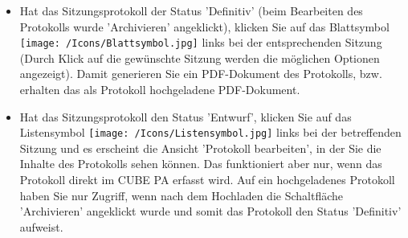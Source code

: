 \begin{itemize}
\item
Hat das Sitzungsprotokoll der Status 'Definitiv' (beim Bearbeiten des Protokolls wurde 'Archivieren' angeklickt), klicken Sie auf das Blattsymbol \texttt{[image: /Icons/Blattsymbol.jpg]}  links bei der entsprechenden Sitzung (Durch Klick auf die gewünschte Sitzung werden die möglichen Optionen angezeigt). Damit generieren Sie ein PDF-Dokument des Protokolls, bzw. erhalten das als Protokoll hochgeladene PDF-Dokument.
\item
Hat das Sitzungsprotokoll den Status 'Entwurf', klicken Sie auf das Listensymbol \texttt{[image: /Icons/Listensymbol.jpg]}  links bei der betreffenden Sitzung und es erscheint die Ansicht 'Protokoll bearbeiten', in der Sie die Inhalte des Protokolls sehen können. Das funktioniert aber nur, wenn das Protokoll direkt im CUBE PA erfasst wird. Auf ein hochgeladenes Protokoll haben Sie nur Zugriff, wenn nach dem Hochladen die Schaltfläche 'Archivieren' angeklickt wurde und somit das Protokoll den Status 'Definitiv' aufweist.
\end{itemize}
